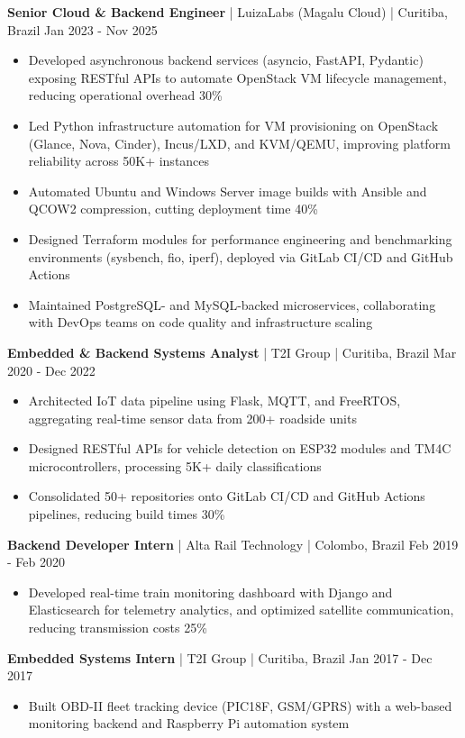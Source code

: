 \documentclass[11pt,letterpaper]{article}
\newcommand{\job}[4]{%
  \vspace{4pt}\textbf{#1} | #2 | #3 \hfill #4\par}
\newenvironment{bullets}
  {\begin{itemize}\setlength{\itemsep}{1pt}\setlength{\parskip}{0pt}\setlength{\topsep}{2pt}}
  {\end{itemize}}
\begin{document}
\job{Senior Cloud \& Backend Engineer}{LuizaLabs (Magalu Cloud)}{Curitiba, Brazil}{Jan 2023 - Nov 2025}
\begin{bullets}
\item Developed asynchronous backend services (asyncio, FastAPI, Pydantic) exposing RESTful APIs to automate OpenStack VM lifecycle management, reducing operational overhead 30\%
\item Led Python infrastructure automation for VM provisioning on OpenStack (Glance, Nova, Cinder), Incus/LXD, and KVM/QEMU, improving platform reliability across 50K+ instances
\item Automated Ubuntu and Windows Server image builds with Ansible and QCOW2 compression, cutting deployment time 40\%
\item Designed Terraform modules for performance engineering and benchmarking environments (sysbench, fio, iperf), deployed via GitLab CI/CD and GitHub Actions
\item Maintained PostgreSQL- and MySQL-backed microservices, collaborating with DevOps teams on code quality and infrastructure scaling
\end{bullets}

\job{Embedded \& Backend Systems Analyst}{T2I Group}{Curitiba, Brazil}{Mar 2020 - Dec 2022}
\begin{bullets}
\item Architected IoT data pipeline using Flask, MQTT, and FreeRTOS, aggregating real-time sensor data from 200+ roadside units
\item Designed RESTful APIs for vehicle detection on ESP32 modules and TM4C microcontrollers, processing 5K+ daily classifications
\item Consolidated 50+ repositories onto GitLab CI/CD and GitHub Actions pipelines, reducing build times 30\%
\end{bullets}

\job{Backend Developer Intern}{Alta Rail Technology}{Colombo, Brazil}{Feb 2019 - Feb 2020}
\begin{bullets}
\item Developed real-time train monitoring dashboard with Django and Elasticsearch for telemetry analytics, and optimized satellite communication, reducing transmission costs 25\%
\end{bullets}

\job{Embedded Systems Intern}{T2I Group}{Curitiba, Brazil}{Jan 2017 - Dec 2017}
\begin{bullets}
\item Built OBD-II fleet tracking device (PIC18F, GSM/GPRS) with a web-based monitoring backend and Raspberry Pi automation system
\end{bullets}
\end{document}
